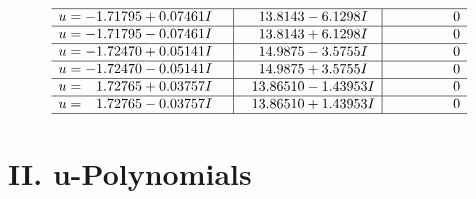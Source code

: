\documentclass[1p]{elsarticle_modified}
\theoremstyle{definition}
\begin{document}
$$\begin{array}{c|c|c}
 \hline 
\begin{aligned}
u &= -1.71795 + 0.07461 I\end{aligned}
 & \phantom{-}13.8143 - 6.1298 I & \phantom{-0.000000 } 0 \\ \hline\begin{aligned}
u &= -1.71795 - 0.07461 I\end{aligned}
 & \phantom{-}13.8143 + 6.1298 I & \phantom{-0.000000 } 0 \\ \hline\begin{aligned}
u &= -1.72470 + 0.05141 I\end{aligned}
 & \phantom{-}14.9875 - 3.5755 I & \phantom{-0.000000 } 0 \\ \hline\begin{aligned}
u &= -1.72470 - 0.05141 I\end{aligned}
 & \phantom{-}14.9875 + 3.5755 I & \phantom{-0.000000 } 0 \\ \hline\begin{aligned}
u &= \phantom{-}1.72765 + 0.03757 I\end{aligned}
 & \phantom{-}13.86510 - 1.43953 I & \phantom{-0.000000 } 0 \\ \hline\begin{aligned}
u &= \phantom{-}1.72765 - 0.03757 I\end{aligned}
 & \phantom{-}13.86510 + 1.43953 I & \phantom{-0.000000 } 0\\
 \hline 
 \end{array}$$\newpage
\newpage\renewcommand{\arraystretch}{1}
\centering \section*{ II. u-Polynomials}
\end{document}
